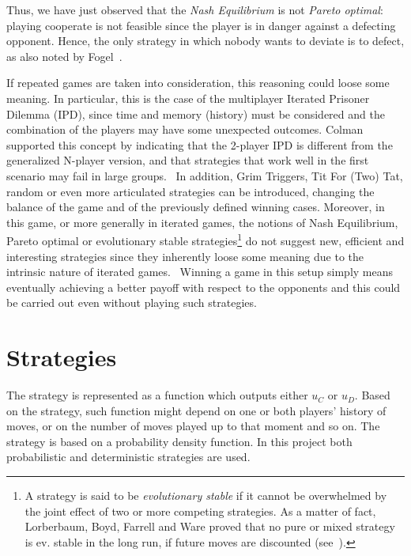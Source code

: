 \documentclass[journal,10pt,twoside]{IEEEtran}
\begin{document}
Thus, we have just observed that the \textit{Nash Equilibrium} is not \textit{Pareto optimal}: playing cooperate is not feasible since the player is in danger against a defecting opponent. Hence, the only strategy in which nobody wants to deviate is to defect, as also noted by Fogel~\cite{fogelEvolvingBehaviors}.

If repeated games are taken into consideration, this reasoning could loose some meaning. In particular, this is the case of the multiplayer Iterated Prisoner Dilemma (IPD), since time and memory (history) must be considered and the combination of the players may have some unexpected outcomes.
Colman supported this concept by indicating that the 2-player IPD is different from the generalized N-player version, and that strategies that work well in the first scenario may fail in large groups.~\cite{yao1994experimental}
In addition, Grim Triggers, Tit For (Two) Tat, random or even more articulated strategies can be introduced, changing the balance of the game and of the previously defined winning cases.
Moreover, in this game, or more generally in iterated games, the notions of Nash Equilibrium, Pareto optimal or evolutionary stable strategies\footnote{A strategy is said to be \textit{evolutionary stable} if it cannot be overwhelmed by the joint effect of two or more competing strategies. As a matter of fact, Lorberbaum, Boyd, Farrell and Ware proved that no pure or mixed strategy is ev. stable in the long run, if future moves are discounted (see~\cite{lorb94}).} do not suggest new, efficient and interesting strategies since they inherently loose some meaning due to the intrinsic nature of iterated games.~\cite{mathieu2017}
Winning a game in this setup simply means eventually achieving a better payoff with respect to the opponents and this could be carried out even without playing such strategies.

\section{Strategies} \label{s:str}
The strategy is represented as a function which outputs either $u_C$ or $u_D$. Based on the strategy, such function might depend on one or both players' history of moves, or on the number of moves played up to that moment and so on.
The strategy is based on a probability density function. In this project both probabilistic and deterministic strategies are used.
\end{document}
